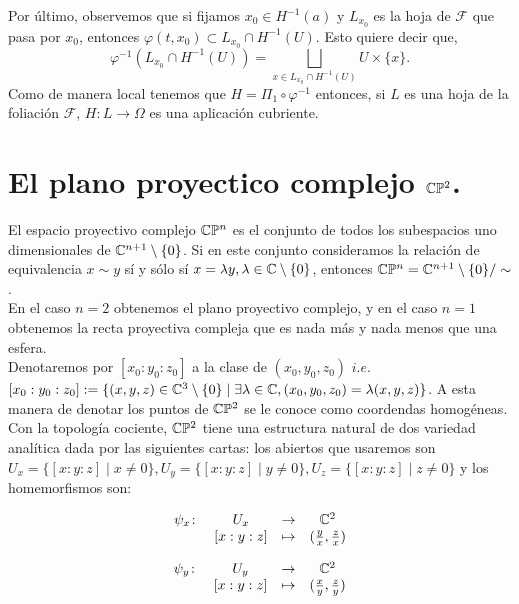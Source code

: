 \noindent Por último, observemos que si fijamos $x_{0}\in H^{-1}(a)$ y $L_{x_{0}}$ es la hoja de $\mathcal{F}$ que pasa por $x_{0}$, entonces $\varphi(t,x_{0})\subset L_{x_{0}}\cap H^{-1}(U)$. Esto quiere decir que,
$$\varphi^{-1}(L_{x_{0}}\cap H^{-1}(U))=\bigsqcup_{x\in L_{x_{0}}\cap H^{-1}(U)}U\times \{x\}.$$ Como de manera local tenemos que $H=\Pi_{1}\circ \varphi^{-1}$ entonces, si $L$ es una hoja de la foliación $\mathcal{F}$, $H\colon L\rightarrow \Omega$ es una aplicación cubriente.

\section{El plano proyectico complejo $\mathbb{C}\mathbb{P}^{2}$.}

El espacio proyectivo complejo $\mathbb{C}\mathbb{P}^{n}$ es el conjunto de todos los subespacios uno dimensionales de $\mathbb{C}^{n+1}\setminus\{0\}$. Si en este conjunto consideramos la relación de equivalencia $x\sim y$ sí y sólo sí $x=\lambda y, \lambda\in\mathbb{C}\setminus\{0\}$, entonces $\mathbb{C}\mathbb{P}^{n} = \mathbb{C}^{n+1}\setminus\{0\} / \sim$.\\

En el caso $n=2$ obtenemos el plano proyectivo complejo, y en el caso $n=1$ obtenemos la recta proyectiva compleja que es nada más y nada menos que una esfera.\\

Denotaremos por $[x_{0}:y_{0}:z_{0}]$ a la clase de $(x_{0},y_{0},z_{0})$ $\mathit{i.e.}$ $[x_{0}:y_{0}:z_{0}]:=\{(x,y,z)\in\mathbb{C}^{3}\setminus\{0\} \mid \exists\lambda\in\mathbb{C},(x_{0},y_{0},z_{0})=\lambda (x,y,z)\}$. A esta manera de denotar los puntos de $\mathbb{C}\mathbb{P}^2$ se le conoce como coordendas homogéneas.\\

Con la topología cociente, $\mathbb{C}\mathbb{P}^2$ tiene una estructura natural de  dos variedad analítica dada por las siguientes cartas: los abiertos que usaremos son $U_{x}=\{[x:y:z] \mid x\neq 0\},U_{y}=\{[x:y:z] \mid y\neq 0\},U_{z}=\{[x:y:z] \mid z\neq 0\}$ y los homemorfismos son:

$$
\begin{matrix}
\psi_{x} \colon & U_{x} &  \rightarrow & \mathbb{C}^{2}\\
& [x:y:z] &  \mapsto &  (\frac{y}{x},\frac{z}{x})
\end{matrix}
$$

$$
\begin{matrix}
\psi_{y} \colon & U_{y} &  \rightarrow & \mathbb{C}^{2}\\
& [x:y:z] &  \mapsto &  (\frac{x}{y},\frac{z}{y})
\end{matrix}
$$

